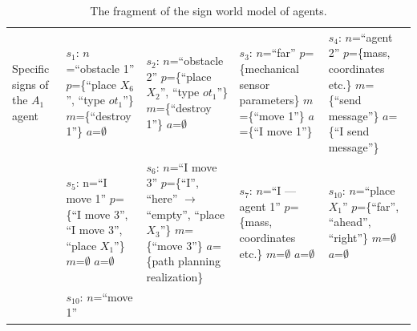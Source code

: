 \documentclass[runningheads,a4paper]{llncs}
\begin{document}
\setlength{\tabcolsep}{5pt}
\renewcommand{\arraystretch}{1.5}
\begin{table}\tiny
	\caption{The fragment of the sign world model of agents.}	
	\label{tab:world}
	\begin{tabular}{| p{1.5cm} | p{2.2cm} | p{2.2cm} | p{2.2cm} | p{2.2cm} |}
		\hline
		Specific signs of the $A_1$ agent
		&
		$s_1$: $n$=``obstacle 1''\newline
		$p$=\{``place $X_6$'', ``type $ot_1$''\}\newline
		$m$=\{``destroy 1''\}\newline
		$a$=$\emptyset$
		&
		$s_2$: $n$=``obstacle 2''\newline
		$p$=\{``place $X_2$'', ``type $ot_1$''\}\newline
		$m$=\{``destroy 1''\}\newline
		$a$=$\emptyset$
		&
		$s_3$: $n$=``far''\newline
		$p$=\{mechanical sensor parameters\}\newline
		$m$=\{``move 1''\}\newline
		$a$=\{``I move 1''\}
		&
		$s_4$: $n$=``agent 2''\newline
		$p$=\{mass, coordinates etc.\}\newline
		$m$=\{``send message''\}\newline
		$a$=\{``I send message''\}
		\\\cline{2-5}
		&
		$s_5$: n=``I move 1''\newline
		$p$=\{``I move 3'', ``I move 3'', ``place $X_1$''\}\newline
		$m$=$\emptyset$\newline
		$a$=$\emptyset$	
		&
		$s_6$: $n$=``I move 3''\newline
		$p$=\{``I'', ``here'' $\rightarrow$ ``empty'', ``place $X_3$''\}\newline
		$m$=\{``move 3''\}\newline
		$a$=\{path planning realization\}
		&
		$s_7$: $n$=``I --- agent 1''\newline
		$p$=\{mass, coordinates etc.\}\newline
		$m$=$\emptyset$\newline
		$a$=$\emptyset$	
		&
		$s_{10}$: $n$=``place $X_1$''\newline
		$p$=\{``far'', ``ahead'', ``right''\}\newline
		$m$=$\emptyset$\newline
		$a$=$\emptyset$
		\\ \hline
		&
		$s_{10}$: $n$=``move 1''\newline

\end{tabular}
\end{table}
\end{document}
